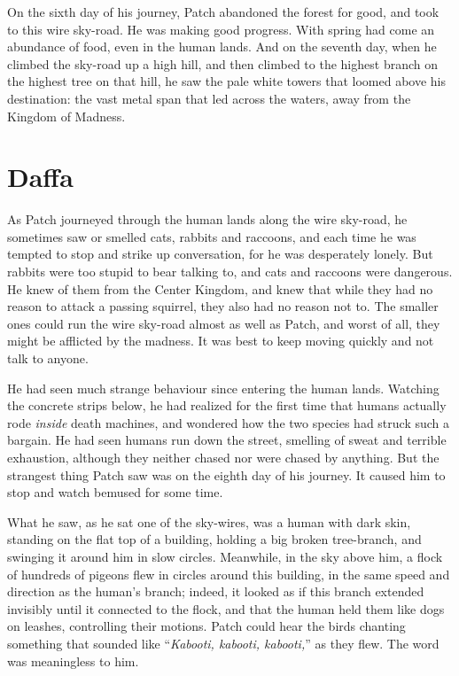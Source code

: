 \documentclass[ebook,oneside,openany,17pt]{memoir}
\newenvironment{tolerant}[1]{%
  \par\tolerance=#1\relax
}{%
  \par
}
\renewcommand{\thechapter}{\Roman{chapter}}
\newcounter{sections}
\newcommand{\sections}[1]{%
  \section*{#1}
  \addtocounter{sections}{1}%
  \pdfbookmark[1]{#1}{section.\thechapter.\thesections}}
\begin{document}
On the sixth day of his journey, Patch abandoned the forest for good,
and took to this wire sky-road. He was making good progress. With
spring had come an abundance of food, even in the human lands. And on
the seventh day, when he climbed the sky-road up a high hill, and then
climbed to the highest branch on the highest tree on that hill, he saw
the pale white towers that loomed above his destination: the vast
metal span that led across the waters, away from the Kingdom of
Madness.


\sections{Daffa}

As Patch journeyed through the human lands along the wire sky-road, he
sometimes saw or smelled cats, rabbits and raccoons, and each time he
was tempted to stop and strike up conversation, for he was desperately
lonely. But rabbits were too stupid to bear talking to, and cats and
raccoons were dangerous. He knew of them from the Center Kingdom, and
knew that while they had no reason to attack a passing squirrel, they
also had no reason not to. The smaller ones could run the wire
sky-road almost as well as Patch, and worst of all, they might be
afflicted by the madness. It was best to keep moving quickly and not
talk to anyone.

\begin{tolerant}{2000}
He had seen much strange behaviour since entering the human
lands. Watching the concrete strips below, he had realized for the
first time that humans actually rode \emph{inside} death machines,
and wondered how the two species had struck such a bargain. He had
seen humans run down the street, smelling of sweat and terrible
exhaustion, although they neither chased nor were chased by
anything. But the strangest thing Patch saw was on the eighth day of
his journey. It caused him to stop and watch bemused for some time.
\end{tolerant}

\begin{tolerant}{500}
What he saw, as he sat one of the sky-wires, was a human with dark
skin, standing on the flat top of a building, holding a big broken
tree-branch, and swinging it around him in slow circles. Meanwhile, in
the sky above him, a flock of hundreds of pigeons flew in circles
around this building, in the same speed and direction as the human’s
branch; indeed, it looked as if this branch extended invisibly until
it connected to the flock, and that the human held them like dogs on
leashes, controlling their motions. Patch could hear the birds
chanting something that sounded like “\emph{Kabooti, kabooti,
kabooti,}” as they flew. The word was meaningless to him.
\end{tolerant}
\end{document}
